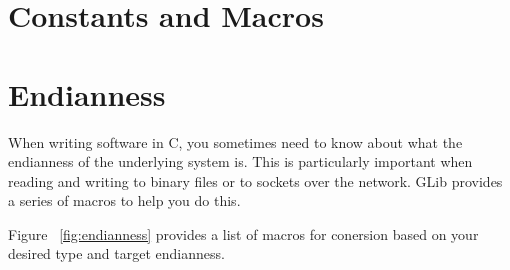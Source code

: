 \section{Constants and Macros}

\section{Endianness}

When writing software in C, you sometimes need to know about what the endianness of the underlying system is.
This is particularly important when reading and writing to binary files or to sockets over the network.
GLib provides a series of macros to help you do this.

Figure ~\ref{fig:endianness} provides a list of macros for conersion based on your desired type and target endianness.

